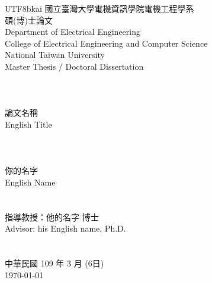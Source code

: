 \documentclass[12pt]{report}
\begin{document}
\onehalfspacing

\begin{titlepage}
\begin{center}

\begin{CJK}{UTF8}{bkai}
\Large{{國立臺灣大學電機資訊學院電機工程學系\\碩(博)士論文}}\\
\large{{Department of Electrical Engineering}}\\
\large{College of Electrical Engineering and Computer Science}\\
\Large{{National Taiwan University}}\\
\Large{{Master Thesis / Doctoral Dissertation}}\\

\hspace*{1cm}~\\
\hspace*{1cm}~\\
\hspace*{1cm}~\\

\Large{論文名稱\\
English Title}\\

\hspace*{1cm}~\\
\hspace*{1cm}~\\
\hspace*{1cm}~\\

\Large{你的名字\\English Name}\\
\hspace*{1cm}~\\
\hspace*{1cm}~\\

\Large{指導教授：他的名字 博士\\Advisor: his English name, Ph.D.}\\
\hspace*{1cm}~\\
\hspace*{1cm}~\\

\Large{中華民國 109 年 3 月 (6日)}\\ 
\today

\end{CJK}
\end{center}
\end{titlepage}
\end{document}
